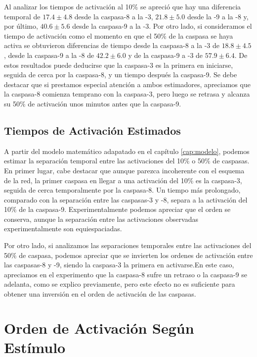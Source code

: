 Al analizar los tiempos de activación al 10$\%$ se apreció que hay una diferencia temporal de $17.4\pm4.8$ desde la caspasa-8 a la -3, $21.8\pm5.0$ desde la -9 a la -8 y, por último, $40.6\pm5.6$ desde la caspasa-9 a la -3. Por otro lado, si consideramos el tiempo de activación como el momento en que el 50$\%$ de la caspasa se haya activa se obtuvieron diferencias de tiempo desde la caspasa-8 a la -3 de $18.8\pm4.5$, desde la caspasa-9 a la -8 de $42.2\pm6.0$ y de la caspasa-9 a -3 de $57.9\pm6.4$. De estos resultados puede deducirse que la caspasa-3 es la primera en iniciarse, seguida de cerca por la caspasa-8, y un tiempo después la caspasa-9. Se debe destacar que si prestamos especial atención a ambos estimadores, apreciamos que la caspasa-8 comienza temprano con la caspasa-3, pero luego se retrasa y alcanza su 50$\%$ de activación unos minutos antes que la caspasa-9.


\subsection{Tiempos de Activación Estimados}

A partir del modelo matemático adapatado en el capítulo \ref{cap:modelo}, podemos estimar la separación temporal entre las activaciones del 10$\%$ o 50$\%$ de caspasas. En primer lugar, cabe destacar que aunque parezca incoherente con el esquema de la red, la primer caspasa en llegar a una activación del 10$\%$ es la caspasa-3, seguida de cerca temporalmente por la caspasa-8. Un tiempo más prolongado, comparado con la separación entre las caspasas-3 y -8, separa a la activación del 10$\%$ de la caspasa-9. Experimentalmente podemos apreciar que el orden se conserva, aunque la separación entre las activaciones observadas experimentalmente son equiespaciadas.

Por otro lado, si analizamos las separaciones temporales entre las activaciones del 50$\%$ de caspasa, podemos apreciar que se invierten los ordenes de activación entre las caspasas-8 y -9, siendo la caspasa-3 la primera en activarse.En este caso, apreciamos en el experimento que la caspasa-8 sufre un retraso o la caspasa-9 se adelanta, como se explico previamente, pero este efecto no es suficiente para obtener una inversión en el orden de activación de las caspasas.


\section{Orden de Activación Según Estímulo}

